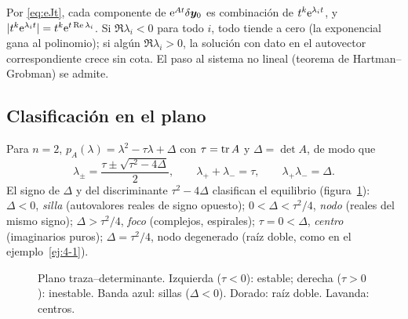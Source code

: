 \documentclass[11pt,twoside]{article}
\newcommand\vy{\bm{y}}
\newcommand\abs[1]{\lvert#1\rvert}
\begin{document}
\begin{demostracion}
Por \eqref{eq:eJt}, cada componente de $\e^{At}\delta\vy_0$ es combinación de $t^k\mathrm{e}^{\lambda_it}$, y
$\abs{t^k\e^{\lambda_it}}=t^k\e^{t\Re\lambda_i}$. Si $\Re\lambda_i<0$ para todo $i$, todo tiende a cero (la exponencial
gana al polinomio); si algún $\Re\lambda_i>0$, la solución con dato en el autovector correspondiente crece sin cota.
El paso al sistema no lineal (teorema de Hartman--Grobman) se admite.
\end{demostracion}

\subsection{Clasificación en el plano}

Para $n=2$, $p_A(\lambda)=\lambda^2-\tau\lambda+\Delta$ con $\tau=\operatorname{tr} A$ y $\Delta=\det A$, de modo que
\begin{equation}\label{eq:tau-delta}
\lambda_\pm=\frac{\tau\pm\sqrt{\tau^2-4\Delta}}{2},\qquad \lambda_++\lambda_-=\tau,\qquad \lambda_+\lambda_-=\Delta .
\end{equation}
El signo de $\Delta$ y del discriminante $\tau^2-4\Delta$ clasifican el equilibrio (figura~\ref{fig:traza}):
$\Delta<0$, \emph{silla} (autovalores reales de signo opuesto); $0<\Delta<\tau^2/4$, \emph{nodo} (reales del
mismo signo); $\Delta>\tau^2/4$, \emph{foco} (complejos, espirales); $\tau=0<\Delta$, \emph{centro} (imaginarios puros);
$\Delta=\tau^2/4$, nodo degenerado (raíz doble, como en el ejemplo~\ref{ej:4-1}).

\begin{figure}[!htbp]
\centering
{}
\caption{Plano traza--determinante. Izquierda ($\tau<0$): estable; derecha ($\tau>0$): inestable. Banda azul:
sillas ($\Delta<0$). Dorado: raíz doble. Lavanda: centros.}
\label{fig:traza}
\end{figure}
\end{document}
